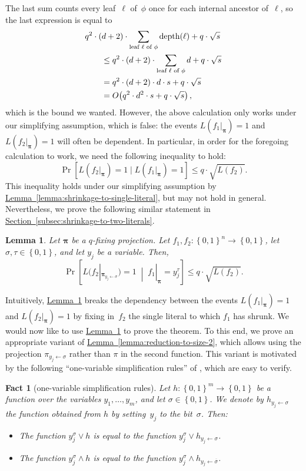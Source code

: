\documentclass[11pt]{article}
\numberwithin{equation}{section}
\newtheorem{lemma}[theorem]{Lemma}
\newtheorem{fact}[theorem]{Fact}
\theoremstyle{definition}
\theoremstyle{plain}
\newcommand{\expref}[2]{\hyperref[#2]{#1~\ref{#2}}}
\theoremstyle{definition}\newtheorem{notation}[theorem]{Notation}\theoremstyle{plain}
\newcommand{\B}{\left\{ 0,1 \right \}}
\newcommand{\p}{\boldsymbol{\pi}}
\newcommand{\dpt}{\mathrm{depth}}
\theoremstyle{definition}
\theoremstyle{plain}
\begin{document}
The last sum counts every leaf~$\ell$ of~$\phi$ once for each
internal ancestor of~$\ell$, so the last expression is equal to
\begin{align*}
 & q^{2}\cdot(d+2)\cdot\sum_{\text{leaf \ensuremath{\ell} of \ensuremath{\phi}}}\dpt(\ell)+q\cdot\sqrt{s}\\
 & \qquad\le q^{2}\cdot(d+2)\cdot\sum_{\text{leaf \ensuremath{\ell} of \ensuremath{\phi}}}d+q\cdot\sqrt{s}\\
 & \qquad=q^{2}\cdot(d+2)\cdot d\cdot s+q\cdot\sqrt{s}\\
 & \qquad=O\!\left(q^{2}\cdot d^{2}\cdot s+q\cdot\sqrt{s}\right),
\end{align*}
which is the bound we wanted. However, the above calculation only
works under our simplifying assumption, which is false: the events
$L(f_{1}|_{\p})=1$ and $L(f_{2}|_{\p})=1$ will often be dependent.
In particular, in order for the foregoing calculation to work, we
need the following inequality to hold: 
\[
\Pr\!\left[L(f_{2}|_{\p})=1\mid L(f_{1}|_{\p})=1\right]\le q\cdot\sqrt{L(f_{2})}.
\]
This inequality holds under our simplifying assumption by \expref{Lemma}{lemma:shrinkage-to-single-literal},
but may not hold in general. Nevertheless, we prove the following
similar statement in \expref{Section}{subsec:shrinkage-to-two-literals}. 
\begin{lemma}
\label{lemma:shrinkage-with-conditioning}Let $\p$ be a $q$-fixing projection.
Let $f_{1},f_{2}\colon\B^{n}\to\B$, let $\sigma,\tau\in\B$, and
let $y_{j}$ be a variable. Then, 
\[
\Pr\!\left[L(f_{2}|_{\p_{y_{j}\gets\sigma}})=1\;\middle|\;f_{1}|_{\p}=y_{j}^{\tau}\right]\le q\cdot\sqrt{L(f_{2})}.
\]
\end{lemma}

Intuitively, \expref{Lemma}{lemma:shrinkage-with-conditioning} breaks the dependency
between the events $L(f_{1}|_{\p})=1$ and $L(f_{2}|_{\p})=1$ by
fixing in~$f_{2}$ the single literal to which $f_{1}$ has shrunk.
We would now like to use \expref{Lemma}{lemma:shrinkage-with-conditioning} to prove
the theorem. To this end, we prove an appropriate variant of \expref{Lemma}{lemma:reduction-to-size-2},
which allows using the projection $\pi_{y_{j}\gets\sigma}$ rather
than $\pi$ in the second function. This variant is motivated by the
following ``one-variable simplification rules'' of \cite{H98},
which are easy to verify. 
\begin{fact}[one-variable simplification rules]
\label{fact:simplification-rules}Let $h\colon\B^{m}\to\B$ be a function
over the variables $y_{1},\ldots,y_{m}$, and let $\sigma\in\B$.
We denote by $h_{y_{j}\gets\sigma}$ the function obtained from $h$
by setting~$y_{j}$ to the bit~$\sigma$. Then: 
\begin{itemize}
\item The function $y_{j}^{\sigma}\vee h$ is equal to the function $y_{j}^{\sigma}\vee h_{y_{j}\gets\sigma}$. 
\item The function $y_{j}^{\sigma}\wedge h$ is equal to the function $y_{j}^{\sigma}\wedge h_{y_{j}\gets\overline{\sigma}}$. 
\end{itemize}
\end{fact}
\end{document}
